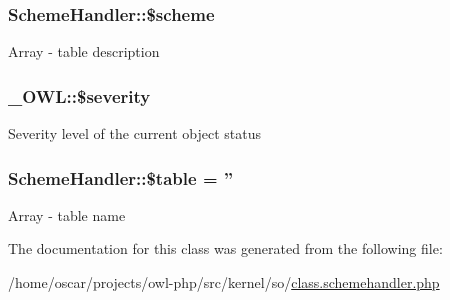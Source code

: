\subsubsection[{\$scheme}]{\setlength{\rightskip}{0pt plus 5cm}SchemeHandler::\$scheme}\label{classSchemeHandler_aeb6dfa54ebd11b0d6acc51b8244d598c}
Array -\/ table description 
\subsubsection[{\$severity}]{\setlength{\rightskip}{0pt plus 5cm}\_\-OWL::\$severity}\label{class__OWL_ad26b40a9dbbacb33e299b17826f8327c}
Severity level of the current object status 
\subsubsection[{\$table}]{\setlength{\rightskip}{0pt plus 5cm}SchemeHandler::\$table = ''}\label{classSchemeHandler_aea92c0f74dbb2e1efd07bdb472660e20}
Array -\/ table name 

The documentation for this class was generated from the following file:\begin{DoxyCompactItemize}
\item 
/home/oscar/projects/owl-\/php/src/kernel/so/\hyperlink{class_8schemehandler_8php}{class.schemehandler.php}\end{DoxyCompactItemize}
